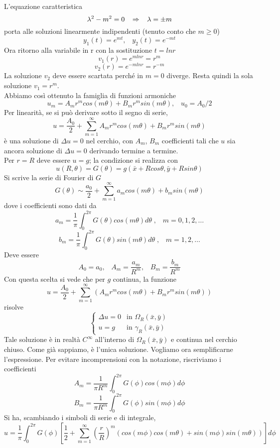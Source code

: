 L'equazione caratteristica
\[
	\lambda^2 - m^2=0 \;\;\; \Rightarrow \;\;\; \lambda= \pm m
\]
porta alle soluzioni linearmente indipendenti (tenuto conto che $m\geq 0$)
\[
	y_1(t)= e^{mt}, \;\;\; y_2(t)= e^{-mt}
\]
Ora ritorno alla variabile in r con la sostituzione $t= ln r$
\[
	v_1(r)= e^{m lnr}= r^m
\]
\[
	v_2(r)= e^{-m lnr}= r^{-m}
\]
La soluzione $v_2$ deve essere scartata perch\'e in $m=0$ diverge.
Resta quindi la sola soluzione $v_1=r^m$.\\
Abbiamo cos\`i ottenuto la famiglia di funzioni armoniche
\[
	u_m= A_m r^m cos(m \theta)+ B_m r^m sin (m \theta), \;\;\; u_0= A_0/2
\]
Per linearit\`a, se si pu\`o derivare sotto il segno di serie,
\[
	u= \frac{A_0}{2} + \sum_{m=1}^{\infty}
	A_m r^m cos(m \theta)+ B_m r^m sin (m \theta)
\]
\`e una soluzione di $\Delta u=0$ nel cerchio, con $A_m$, $B_m$ coefficienti
tali che $u$ sia ancora soluzione di $\Delta u= 0$ derivando termine a
termine.\\
Per $r=R$ deve essere $u=g$; la condizione si realizza con
\[
	u(R, \theta)= G(\theta)= g(\bar{x}+ Rcos \theta, \bar{y} + Rsin\theta)
\]
Si scrive la serie di Fourier di $G$
\[
	G(\theta) \sim \frac{a_0}{2}+
	\sum_{m=1}^{\infty} a_m cos (m \theta) + b_m sin (m \theta)
\]
dove i coefficienti sono dati da
\[
	a_m = \frac{1}{\pi}
	\int_{0}^{2 \pi} G(\theta)cos(m \theta) d\theta \; , \;\;\;
m=0,1,2,\ldots
\]
\[
	b_m = \frac{1}{\pi}
	\int_{0}^{2 \pi} G(\theta)sin(m \theta) d\theta \; , \;\;\; m=1,2,\ldots
\]
Deve essere
\[
	A_0=a_0, \;\;\; A_m=\frac{a_m}{R^m}, \;\;\; B_m = \frac{b_m}{R^m}
\]
Con questa scelta si vede che per $g$ continua, la funzione
\[
	u=\frac{A_0}{2}+ \sum_{m=1}^{\infty} \left(
	A_mr^m cos (m \theta)+ B_m r^m sin (m \theta)
	\right)
\]
risolve
\[
	\left\{
	\begin{array}{ll}
		\Delta u=0 	& \text{in } \Omega_R(\bar{x}, \bar{y}) \\
		u=g 		& \text{in } \gamma_R(\bar{x}, \bar{y})
	\end{array}
	\right.
\]
Tale soluzione \`e in realt\`a $C^{\infty}$ all'interno di $\Omega_R (\bar{x},
\bar{y})$
e continua nel cerchio chiuso. Come gi\`a sappiamo, \`e l'unica soluzione.
Vogliamo ora semplificarne l'espressione. Per evitare incomprensioni con la
notazione, riscriviamo i coefficienti
\[
	A_m = \frac{1}{\pi R^m}
	\int_{0}^{2 \pi} G(\phi)cos(m \phi) d\phi
\]
\[
	B_m = \frac{1}{\pi R^m}
	\int_{0}^{2 \pi} G(\phi)sin(m \phi) d\phi
\]
Si ha, scambiando i simboli di serie e di integrale,
\[
	u= \frac{1}{\pi} \int_{0}^{2\pi} G(\phi)
	\left[
	\frac{1}{2}+ \sum_{m=1}^{\infty} \left( \frac{r}{R} \right)^m
	\left(
	cos(m \phi)cos(m \theta) + sin(m\phi)sin(m \theta)
	\right)
	\right] d\phi
\]
